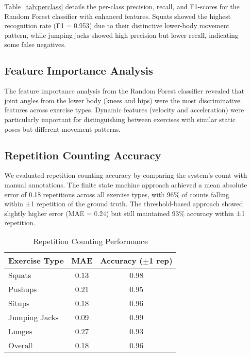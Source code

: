 \documentclass[conference]{IEEEtran}
\begin{document}
Table~\ref{tab:perclass} details the per-class precision, recall, and F1-scores for the Random Forest classifier with enhanced features. Squats showed the highest recognition rate (F1 = 0.953) due to their distinctive lower-body movement pattern, while jumping jacks showed high precision but lower recall, indicating some false negatives.

\subsection{Feature Importance Analysis}
The feature importance analysis from the Random Forest classifier revealed that joint angles from the lower body (knees and hips) were the most discriminative features across exercise types. Dynamic features (velocity and acceleration) were particularly important for distinguishing between exercises with similar static poses but different movement patterns.

\subsection{Repetition Counting Accuracy}
We evaluated repetition counting accuracy by comparing the system's count with manual annotations. The finite state machine approach achieved a mean absolute error of 0.18 repetitions across all exercise types, with 96\% of counts falling within ±1 repetition of the ground truth. The threshold-based approach showed slightly higher error (MAE = 0.24) but still maintained 93\% accuracy within ±1 repetition.

\begin{table}[t]
  \centering
  \caption{Repetition Counting Performance}
  \label{tab:rep_counting}
  \begin{adjustbox}{max width=\linewidth}
  \begin{tabular}{lcc}
  \toprule
  \textbf{Exercise Type} & \textbf{MAE} & \textbf{Accuracy ($\pm$1 rep)} \\
  \midrule
  Squats & 0.13 & 0.98 \\
  Pushups & 0.21 & 0.95 \\
  Situps & 0.18 & 0.96 \\
  Jumping Jacks & 0.09 & 0.99 \\
  Lunges & 0.27 & 0.93 \\
  \midrule
  Overall & 0.18 & 0.96 \\
  \bottomrule
  \end{tabular}
  \end{adjustbox}
\end{table}
\end{document}
